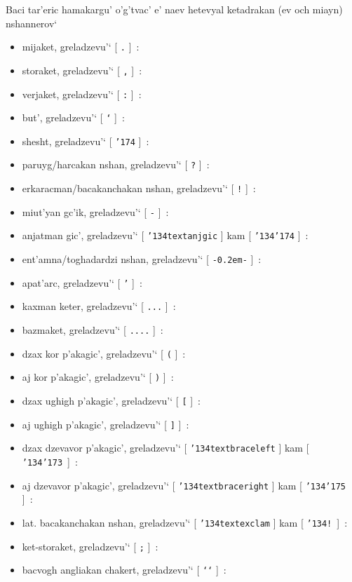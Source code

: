 \documentclass[12pt,a4paper]{article}
\def\mybs{\char'134}
\def\mybar{\char'174}
\def\mylbrace{\char'173}
\def\myrbrace{\char'175}
\begin{document}
Baci tar'eric hamakargu' o'g'tvac' e' naev hetevyal ketadrakan (ev och miayn)
nshannerov`

\begin{itemize}
\item[\artm .]\quad mijaket, greladzevu'` [ {\tt .} ]~:
\item[\artm ,]\quad storaket, greladzevu'` [ {\tt ,} ]~:
\item[\artm :]\quad verjaket, greladzevu'` [ {\tt :} ]~:
\item[\artm `]\quad but', greladzevu'` [ {\tt `} ]~:
\item[\artm |]\quad shesht, greladzevu'` [ {\tt\mybar} ]~:
\item[\artm ?]\quad paruyg/harcakan nshan, greladzevu'` [ {\tt ?} ]~:
\item[\artm !]\quad erkaracman/bacakanchakan nshan, greladzevu'` [ {\tt !} ]~:
\item[\artm -]\quad miut'yan gc'ik, greladzevu'` [ {\tt -} ]~:
\item[\artm \|]\quad anjatman gic', greladzevu'`
  [ {\tt \mybs textanjgic} ] kam [ {\tt \mybs\mybar} ]~:
\item[\artm --]\quad ent'amna/toghadardzi nshan, greladzevu'`
  [ {\tt -{\kern0.2em}-} ]~:
\item[\artm ']\quad apat'arc, greladzevu'` [ {\tt '} ]~:
\item[\artm ...]\quad kaxman keter, greladzevu'` [ {\tt ...} ]~:
\item[\artm ....]\quad bazmaket, greladzevu'` [ {\tt ....} ]~:
\item[\artm (]\quad dzax kor p'akagic', greladzevu'` [ {\tt (} ]~:
\item[\artm )]\quad aj kor p'akagic', greladzevu'` [ {\tt )} ]~:
\item[{\artm [}]\quad dzax ughigh p'akagic', greladzevu'` [ {\tt [} ]~:
\item[{\artm ]}]\quad aj ughigh p'akagic', greladzevu'` [ {\tt ]} ]~:
\item[\artm \{]\quad dzax dzevavor p'akagic', greladzevu'`
  [ {\tt \mybs textbraceleft} ] kam [ {\tt \mybs\mylbrace}~]~:
\item[\artm \}]\quad aj dzevavor p'akagic', greladzevu'`
  [ {\tt \mybs textbraceright} ] kam [ {\tt \mybs\myrbrace} ]~:
\item[\artm \!]\quad lat. bacakanchakan nshan, greladzevu'` 
  [ {\tt \mybs textexclam} ] kam [ {\tt \mybs!}~]~:
\item[\artm ;]\quad ket-storaket, greladzevu'` [ {\tt ;} ]~:
\item[\artm ``]\quad bacvogh angliakan chakert, greladzevu'` [ {\tt `{}`} ]~:

\end{itemize}
\end{document}
